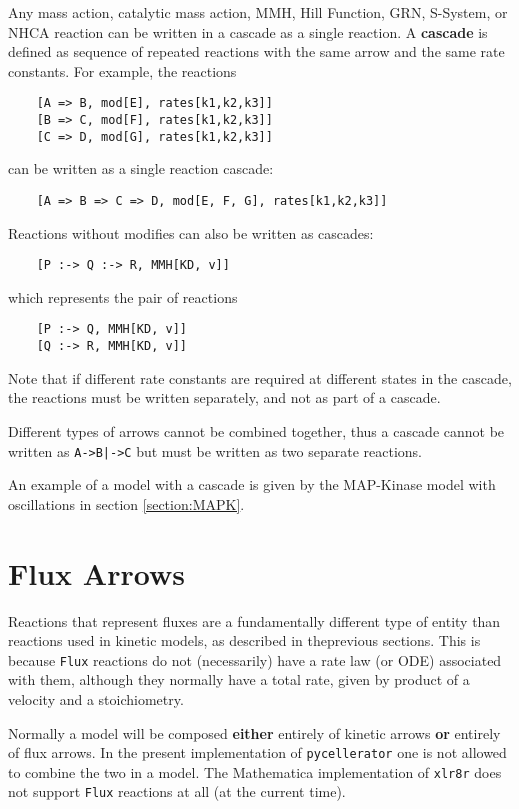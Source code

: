 {Any mass action, catalytic mass action, MMH, Hill Function, GRN, S-System, or NHCA reaction can be written in a cascade as a single reaction. A \textbf{cascade} is defined as sequence of repeated reactions with the same arrow and the same rate constants. For example, the reactions
\begin{lstlisting}
    [A => B, mod[E], rates[k1,k2,k3]]
    [B => C, mod[F], rates[k1,k2,k3]]
    [C => D, mod[G], rates[k1,k2,k3]]
\end{lstlisting}
can be written as a single reaction cascade:
\begin{lstlisting}
    [A => B => C => D, mod[E, F, G], rates[k1,k2,k3]] 
\end{lstlisting}
Reactions without modifies can also be written as cascades:
\begin{lstlisting}
    [P :-> Q :-> R, MMH[KD, v]]
\end{lstlisting}
which represents the pair of reactions 
\begin{lstlisting}
    [P :-> Q, MMH[KD, v]]
    [Q :-> R, MMH[KD, v]]
\end{lstlisting}
Note that if different rate constants are required at different states in the cascade, the reactions must be written separately, and not as part of a cascade.

Different types of arrows cannot be combined together, thus a cascade cannot be written as \verb.A->B|->C. but must be written as two separate reactions. 

An example of a model with a cascade is given by the MAP-Kinase model with oscillations in section \ref{section:MAPK}. 


\section{Flux Arrows}
Reactions that represent fluxes are a fundamentally different type of entity than reactions used in kinetic models, as described in theprevious sections. This is because {\tt Flux} reactions do not (necessarily) have a rate law (or ODE) associated with them, although they normally have a total rate, given by product of a velocity and a stoichiometry. 

Normally a model will be composed \textbf{either} entirely of kinetic arrows \textbf{or} entirely of flux arrows. In the present implementation of {\tt pycellerator} one is not allowed to combine the two in a model.  The Mathematica implementation of {\tt xlr8r} does not support {\tt Flux} reactions at all (at the current time). 

}
